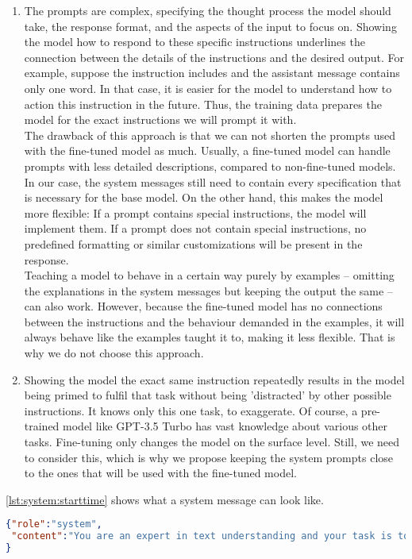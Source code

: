 \begin{enumerate}
    \item
        The prompts are complex, specifying the thought process the model should take, the response format, and the aspects of the input to focus on. Showing the model how to respond to these specific instructions underlines the connection between the details of the instructions and the desired output. For example, suppose the instruction includes  and the assistant message contains only one word. In that case, it is easier for the model to understand how to action this instruction in the future. Thus, the training data prepares the model for the exact instructions we will prompt it with.\\
        The drawback of this approach is that we can not shorten the prompts used with the fine-tuned model as much. Usually, a fine-tuned model can handle prompts with less detailed descriptions, compared to non-fine-tuned models. In our case, the system messages still need to contain every specification that is necessary for the base model. On the other hand, this makes the model more flexible: If a prompt contains special instructions, the model will implement them. If a prompt does not contain special instructions, no predefined formatting or similar customizations will be present in the response.\\
        Teaching a model to behave in a certain way purely by examples – omitting the explanations in the system messages but keeping the output the same – can also work. However, because the fine-tuned model has no connections between the instructions and the behaviour demanded in the examples, it will always behave like the examples taught it to, making it less flexible. That is why we do not choose this approach.
    \item 
        Showing the model the exact same instruction repeatedly results in the model being primed to fulfil that task without being 'distracted' by other possible instructions. It knows only this one task, to exaggerate. Of course, a pre-trained model like GPT-3.5 Turbo has vast knowledge about various other tasks. Fine-tuning only changes the model on the surface level. Still, we need to consider this, which is why we propose keeping the system prompts close to the ones that will be used with the fine-tuned model.
\end{enumerate}
\autoref{lst:system:starttime} shows what a system message can look like.

\begin{lstlisting}[language=json, caption={System message for determining an activities start timestamp}, label={lst:system:starttime}, float=ht]
{"role":"system",
 "content":"You are an expert in text understanding and your task is to take a given text and a given activity label  and to extract a start date to this activity label. Only output the extracted start date! Rely on the context to determine the start date, as it might not be explicitly mentioned."
}
\end{lstlisting}

